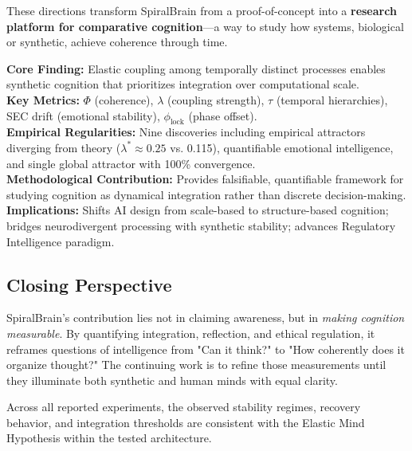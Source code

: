 \documentclass[11pt,a4paper]{article}
\begin{document}
These directions transform SpiralBrain from a proof-of-concept into a \textbf{research platform for comparative cognition}---a way to study how systems, biological or synthetic, achieve coherence through time.

\begin{tcolorbox}[colback=blue!5, colframe=blue, title=Key Takeaways for Skimming Readers]
\textbf{Core Finding:} Elastic coupling among temporally distinct processes enables synthetic cognition that prioritizes integration over computational scale.\\

\textbf{Key Metrics:} $\Phi$ (coherence), $\lambda$ (coupling strength), $\tau$ (temporal hierarchies), SEC drift (emotional stability), $\phi_{\text{lock}}$ (phase offset).\\

\textbf{Empirical Regularities:} Nine discoveries including empirical attractors diverging from theory ($\lambda^* \approx 0.25$ vs. 0.115), quantifiable emotional intelligence, and single global attractor with 100\% convergence.\\

\textbf{Methodological Contribution:} Provides falsifiable, quantifiable framework for studying cognition as dynamical integration rather than discrete decision-making.\\

\textbf{Implications:} Shifts AI design from scale-based to structure-based cognition; bridges neurodivergent processing with synthetic stability; advances Regulatory Intelligence paradigm.\\
\end{tcolorbox}

\subsection{Closing Perspective}

SpiralBrain's contribution lies not in claiming awareness, but in \textit{making cognition measurable}.
By quantifying integration, reflection, and ethical regulation, it reframes questions of intelligence from "Can it think?" to "How coherently does it organize thought?"
The continuing work is to refine those measurements until they illuminate both synthetic and human minds with equal clarity.

Across all reported experiments, the observed stability regimes, recovery behavior,
and integration thresholds are consistent with the Elastic Mind Hypothesis within
the tested architecture.
\end{document}
